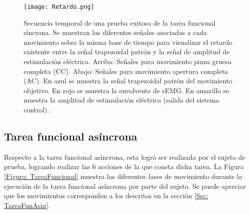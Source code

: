\begin{figure}[htbp]
	\centering
	\texttt{[image: Retardo.png]}
	\caption[Secuencia temporal de una prueba exitosa de la tarea funcional síncrona]{Secuencia temporal de una prueba exitosa de la tarea funcional síncrona. Se muestran las diferentes señales asociadas a cada movimiento sobre la misma base de tiempo para visualizar el retardo existente entre la señal trapezoidal patrón y la señal de amplitud de estimulación eléctrica. Arriba: Señales para movimiento pinza gruesa completa (CC). Abajo: Señales para movimiento apertura completa (AC). En azul se muestra la señal trapezoidal patrón del movimiento objetivo. En rojo se muestra la envolvente de sEMG. En amarillo se muestra la amplitud de estimulación eléctrica (salida del sistema control).}
	\label{Figura: Retardo}
\end{figure}


\newpage
\subsection{Tarea funcional asíncrona}
Respecto a la tarea funcional asíncrona, esta logró ser realizada por el sujeto de prueba, logrando realizar las 6 acciones de la que consta dicha tarea. La Figura \ref{Figura: TareaFuncional} muestra las diferentes fases de movimiento durante la ejecución de la tarea funcional asíncrona por parte del sujeto. Se puede apreciar que los movimientos corresponden a los descritos en la sección \ref{Sec: TareaFunAsin}.

